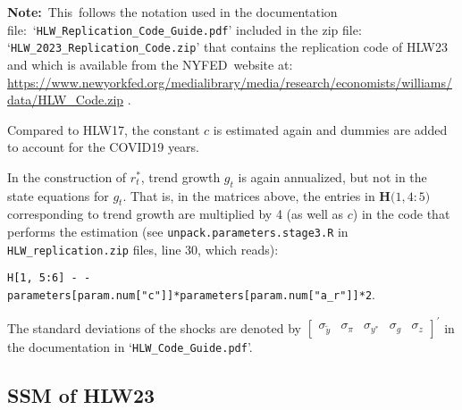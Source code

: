 \documentclass[a4paper,12pt]{article}
\begin{document}
\noindent \textbf{Note:}\ This\ follows the notation used in the
documentation file:\ `\texttt{HLW\_Replication\_Code\_Guide.pdf}' included
in the zip file: `\texttt{HLW\_2023\_Replication\_Code.zip}' that contains
the replication code of HLW23 and which is available from the NYFED\ website
at: %
\url{https://www.newyorkfed.org/medialibrary/media/research/economists/williams/data/HLW_Code.zip}%
.

Compared to HLW17, the constant $c$ is estimated again and dummies are added
to account for the COVID19 years.

In the construction of $r_{t}^{\ast }$, trend growth $g_{t}$ is again
annualized, but not in the state equations for $g_{t}$. That is, in the
matrices above, the entries in $\mathbf{H(}1,4:5\mathbf{)}$ corresponding to
trend growth are multiplied by 4 (as well as $c$) in the code that performs
the estimation (see \texttt{unpack.parameters.stage3.R} in \texttt{%
HLW\_replication.zip} files, line 30, which reads):\ 

\texttt{H[1, 5:6] \TEXTsymbol{<}-
-parameters[param.num["c"]]*parameters[param.num["a\_r"]]*2}.

\noindent The standard deviations of the shocks are denoted by $%
\begin{bmatrix}
\sigma _{\tilde{y}} & \sigma _{\pi } & \sigma _{y^{\ast }} & \sigma _{g} & 
\sigma _{z}%
\end{bmatrix}%
^{\prime }$ in the documentation in `\texttt{HLW\_Code\_Guide.pdf}'.

\pagebreak

\subsection{SSM of HLW23}
\end{document}
